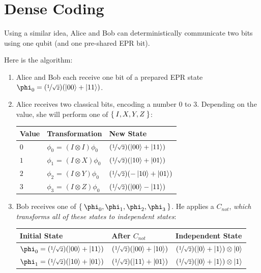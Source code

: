 \documentclass{article}
\begin{document}
\section{Dense Coding}
Using a similar idea, Alice and Bob can deterministically communicate two bits using one qubit (and one pre-shared EPR bit). 

Here is the algorithm:
\begin{enumerate}
    \item Alice and Bob each receive one bit of a prepared EPR state $\phi_0 = (\nicefrac{1}{\sqrt{2}})(\ket{00} + \ket{11})$.
    
    \item Alice receives two classical bits, encoding a number $0$ to $3$. Depending on the value, she will perform one of $\Set{I, X, Y, Z}$:
    
    \begin{tabular}{l|l|l}
         Value & Transformation & New State \\ \hline
          $0$ & $\phi_0$ = $(I \otimes I) \phi_0$ &  $(\nicefrac{1}{\sqrt{2}})(\ket{00} + \ket{11})$ \\
          $1$ & $\phi_1$ = $(I \otimes X) \phi_0$ &  $(\nicefrac{1}{\sqrt{2}})(\ket{10} + \ket{01})$ \\
          $2$ & $\phi_2$ = $(I \otimes Y) \phi_0$ &  $(\nicefrac{1}{\sqrt{2}})(-\ket{10} + \ket{01})$ \\
          $3$ & $\phi_3$ = $(I \otimes Z) \phi_0$ &  $(\nicefrac{1}{\sqrt{2}})(\ket{00} - \ket{11})$ 
    \end{tabular}
    
    \item Bob receives one of $\Set{\phi_0, \phi_1, \phi_2, \phi_3}$. He applies a $C_{not}$, \textit{which transforms all of these states to independent states}:
    
    
    \begin{tabular}{l|l|l}
         Initial State & After $C_{not}$ & Independent State \\ \hline
          $\phi_0 = (\nicefrac{1}{\sqrt{2}})(\ket{00} + \ket{11})$ & $(\nicefrac{1}{\sqrt{2}})(\ket{00} + \ket{10})$ & $(\nicefrac{1}{\sqrt{2}})(\ket{0} + \ket{1})\otimes \ket{0}$  \\
          
          $\phi_1 = (\nicefrac{1}{\sqrt{2}})(\ket{10} + \ket{01})$ & $(\nicefrac{1}{\sqrt{2}})(\ket{11} + \ket{01})$ & $(\nicefrac{1}{\sqrt{2}})(\ket{0} + \ket{1})\otimes \ket{1}$  \\
          

\end{tabular}
\end{enumerate}
\end{document}
